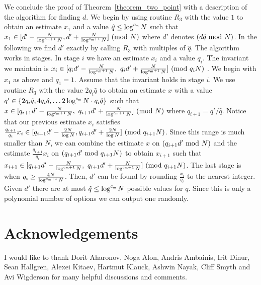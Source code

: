 \documentclass[11pt]{article}
\def\mod{{\rm mod}}
\newcommand\C[1]{{ c_{\sf {#1}} }}
\begin{document}
We conclude the proof of Theorem~\ref{theorem_two_point} with a description of the algorithm for finding $d$. We begin
by using routine $R_3$ with the value $1$ to obtain an estimate $x_1$ and a value $\hat q\le \log^{\C{m}}N$ such that
$x_1 \in [d'-\frac{N}{\log^{\C{m}+1}N},d'+\frac{N}{\log^{\C{m}+1}N}]~(\mod~N)$ where $d'$ denotes $(d \hat q~\mod~N)$.
In the following we find $d'$ exactly by calling $R_3$ with multiples of $\hat q$. The algorithm works in stages. In
stage $i$ we have an estimate $x_i$ and a value $q_i$. The invariant we maintain is $x_i \in [q_i
d'-\frac{N}{\log^{\C{m}+1} N},~q_i d'+\frac{N}{\log^{\C{m}+1} N}]~(\mod~q_i N)$ . We begin with $x_1$ as above and
$q_1=1$. Assume that the invariant holds in stage $i$. We use routine $R_3$ with the value $2q_i \hat q$ to obtain an
estimate $x$ with a value $q' \in \{2q_i\hat q,4q_i\hat q,\ldots 2\log ^{\C{m}}N\cdot q_i\hat q\}$ such that $x\in
[q_{i+1} d'-\frac{N}{\log^{\C{m}+1}N},~q_{i+1} d'+\frac{N}{\log^{\C{m}+1}N}]~(\mod~N)$ where $q_{i+1}=q'/\hat q$.
Notice that our previous estimate $x_i$ satisfies $\frac{q_{i+1}}{q_i}x_i \in [q_{i+1} d'-\frac{2N}{\log N},q_{i+1}
d'+\frac{2N}{\log N}]~(\mod~q_{i+1}N)$. Since this range is much smaller than $N$, we can combine the estimate $x$ on
$(q_{i+1}d'~\mod~N)$ and the estimate $\frac{q_{i+1}}{q_i}x_i$ on $(q_{i+1}d'~\mod~q_{i+1}N)$ to obtain $x_{i+1}$ such
that $x_{i+1} \in [q_{i+1}d' - \frac{N}{\log^{\C{m}+1}N} ,~q_{i+1}d' + \frac{N}{\log^{\C{m}+1}N}] ~(\mod~q_{i+1}N)$.
The last stage is when $q_i \ge \frac{4N}{\log^{\C{m}+1} N}$. Then, $d'$ can be found by rounding $\frac{x_i}{q_i}$ to
the nearest integer. Given $d'$ there are at most $\hat q\le \log^{\C{m}}N$ possible values for $q$. Since this is only
a polynomial number of options we can output one randomly.

\section{Acknowledgements}
I would like to thank Dorit Aharonov, Noga Alon, Andris Ambainis, Irit Dinur, Sean Hallgren, Alexei Kitaev, Hartmut
Klauck, Ashwin Nayak, Cliff Smyth and Avi Wigderson for many helpful discussions and comments.


%
\end{document}
